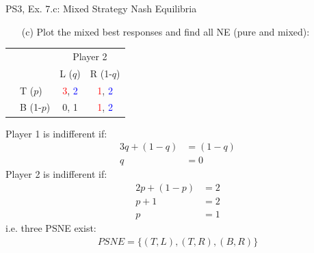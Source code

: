 \begin{frame}{PS3, Ex. 7.c: Mixed Strategy Nash Equilibria}
  \begin{multicols}{2}
    \begin{itemize}
      \item[(c)] Plot the mixed best responses and find all NE (pure and mixed):
    \end{itemize}
    \begin{table}
      \begin{tabular}{cl|c|c|}
        & \multicolumn{1}{c}{} & \multicolumn{2}{c}{\color{blue}Player 2}\\
        \parbox[t]{1mm}{}
        &  &  &  \\
        & T  ($p$)  & \textcolor{red}{3}, \textcolor{blue}{2} & \textcolor{red}{1}, \textcolor{blue}{2} \\
        & B  (1-$p$)& 0, 1 & \textcolor{red}{1}, \textcolor{blue}{2} \\
      \end{tabular}
    \end{table}
    Player 1 is indifferent if:
    \begin{align*}
      3q+(1-q) &= (1-q) \\
      q &= 0
    \end{align*}
    Player 2 is indifferent if:
    \begin{align*}
      2p + (1-p) &= 2 \\
      p + 1      &= 2 \\
      p          &= 1
    \end{align*}
    i.e. three PSNE exist:
    \begin{align*}
      PSNE=\{(T,L),(T,R),(B,R)\}
    \end{align*}
  \vfill\null \columnbreak
  \vfill\null
  \end{multicols}
\end{frame}
